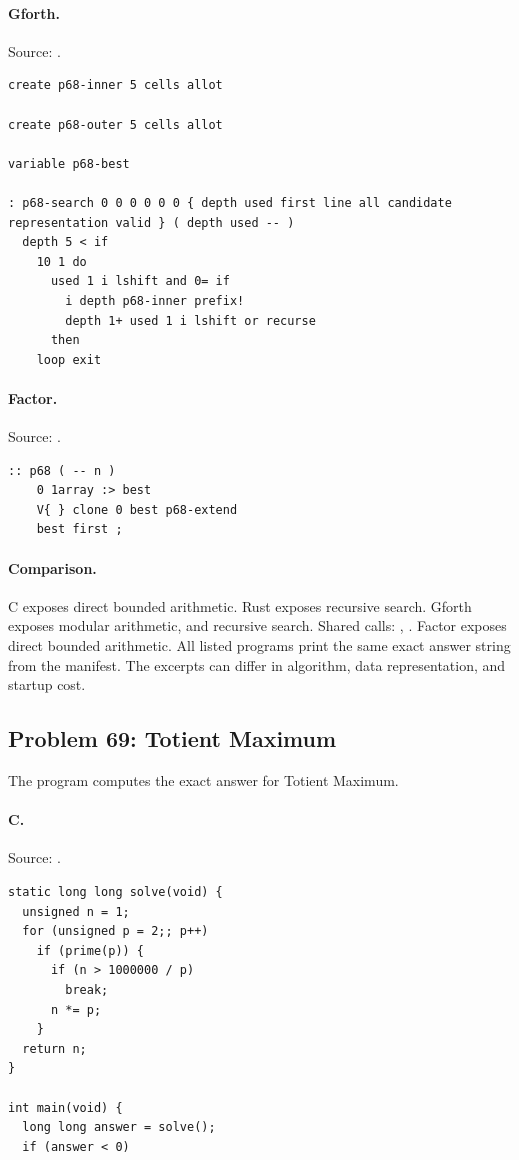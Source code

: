 \paragraph{Gforth.} Source: .
\begin{lstlisting}
create p68-inner 5 cells allot

create p68-outer 5 cells allot

variable p68-best

: p68-search 0 0 0 0 0 0 { depth used first line all candidate representation valid } ( depth used -- )
  depth 5 < if
    10 1 do
      used 1 i lshift and 0= if
        i depth p68-inner prefix!
        depth 1+ used 1 i lshift or recurse
      then
    loop exit
\end{lstlisting}

\paragraph{Factor.} Source: .
\begin{lstlisting}
:: p68 ( -- n )
    0 1array :> best
    V{ } clone 0 best p68-extend
    best first ;
\end{lstlisting}

\paragraph{Comparison.}
C exposes direct bounded arithmetic. Rust exposes recursive search. Gforth exposes modular arithmetic, and recursive search. Shared calls: \texttt{}, \texttt{}. Factor exposes direct bounded arithmetic.
All listed programs print the same exact answer string from the manifest. The excerpts can differ in algorithm, data representation, and startup cost.

\subsection{Problem 69: Totient Maximum}
\label{walkthrough:p69}
The program computes the exact answer for Totient Maximum.

\paragraph{C.} Source: .
\begin{lstlisting}
static long long solve(void) {
  unsigned n = 1;
  for (unsigned p = 2;; p++)
    if (prime(p)) {
      if (n > 1000000 / p)
        break;
      n *= p;
    }
  return n;
}

int main(void) {
  long long answer = solve();
  if (answer < 0)
\end{lstlisting}

